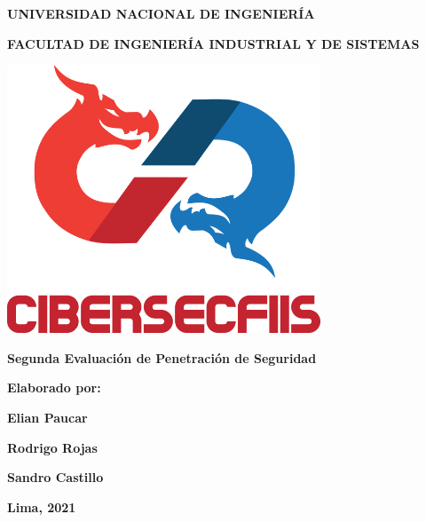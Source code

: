 \begin{titlepage}
    \centering
        {\large \textbf{UNIVERSIDAD NACIONAL DE INGENIERÍA}} \par \vspace{0.3cm}
        {\large \textbf{FACULTAD DE INGENIERÍA INDUSTRIAL Y DE SISTEMAS}} \par \vspace{1.125cm}
        \includegraphics[width=0.7\textwidth]{imagenes/CiberSecFIIS.png} \par \vspace{1.125cm}
        {\LARGE \textbf{Segunda Evaluación de Penetración de Seguridad}}\par \vspace{1cm}
        {\Large \textbf{Elaborado por:}} \par \vspace{1cm}
        {\large \textbf{Elian Paucar}} \par \vspace{0.8cm}
        {\large \textbf{Rodrigo Rojas}} \par \vspace{0.8cm}
        {\large \textbf{Sandro Castillo}} \par \vspace{2.75cm}
        \vfill
        {\textbf{Lima, 2021}}
\end{titlepage}